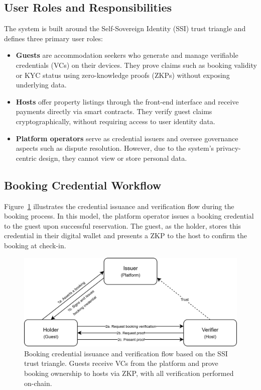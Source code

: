 \documentclass[conference]{IEEEtran}
\begin{document}
\subsection{User Roles and Responsibilities}

The system is built around the Self-Sovereign Identity (SSI) trust triangle and defines three primary user roles:

\begin{itemize}
  \item \textbf{Guests} are accommodation seekers who generate and manage verifiable credentials (VCs) on their devices. They prove claims such as booking validity or KYC status using zero-knowledge proofs (ZKPs) without exposing underlying data.
  \item \textbf{Hosts} offer property listings through the front-end interface and receive payments directly via smart contracts. They verify guest claims cryptographically, without requiring access to user identity data.
  \item \textbf{Platform operators} serve as credential issuers and oversee governance aspects such as dispute resolution. However, due to the system’s privacy-centric design, they cannot view or store personal data.
\end{itemize}

\subsection{Booking Credential Workflow}
Figure~\ref{fig:booking_communication_diagram} illustrates the credential issuance and verification flow during the booking process. In this model, the platform operator issues a booking credential to the guest upon successful reservation. The guest, as the holder, stores this credential in their digital wallet and presents a ZKP to the host to confirm the booking at check-in.

\begin{figure}[h!]
  \centering
  \includegraphics[width=0.99\linewidth]{communication-booking.png} %
  \caption{Booking credential issuance and verification flow based on the SSI trust triangle. Guests receive VCs from the platform and prove booking ownership to hosts via ZKP, with all verification performed on-chain.}
  \label{fig:booking_communication_diagram}
\end{figure}
\end{document}
